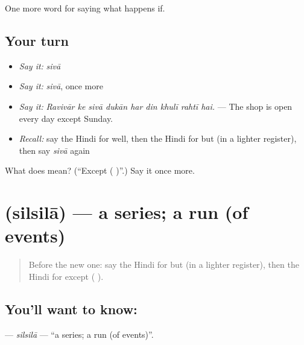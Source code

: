 \begin{grammarlens}[title={What you've built}]
One more word for saying what happens if.
\end{grammarlens}

\subsection*{Your turn}
\begin{itemize}
\raggedright
  \item \emph{Say it:} \emph{sivā}
  \item \emph{Say it:} \emph{sivā}, once more
  \item \emph{Say it:} \emph{Ravivār ke sivā dukān har din khulī rahtī hai.} — The shop is open every day except Sunday.
  \item \emph{Recall:} say the Hindi for well, then the Hindi for but (in a lighter register), then say \emph{sivā} again
\end{itemize}

\begin{tcolorbox}[breakable,colback=teal!4,colframe=teal!35!black,title={Before you move on}]
What does  mean? (\textquotedblleft{}Except ( )\textquotedblright{}.) Say it once more.
\end{tcolorbox}
\section[\texorpdfstring{\hi{सिलसिला} (silsilā)}{सिलसिला (silsilā)}]{ (silsilā) — a series; a run (of events)}

\label{lesson:HI-C553-silsila}



\begin{quote}
Before the new one: say the Hindi for but (in a lighter register), then the Hindi for except ( ).
\end{quote}

\subsection*{You'll want to know: }
\textbf{} — \emph{silsilā} — \textquotedblleft{}a series; a run (of events)\textquotedblright{}.

\begin{quote}
        
\end{quote}

